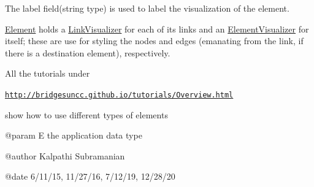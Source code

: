 The label field(string type) is used to label the visualization of the element.

\hyperlink{classbridges_1_1datastructure_1_1_element}{Element} holds a \hyperlink{classbridges_1_1datastructure_1_1_link_visualizer}{Link\+Visualizer} for each of its links and an \hyperlink{classbridges_1_1datastructure_1_1_element_visualizer}{Element\+Visualizer} for itself; these are use for styling the nodes and edges (emanating from the link, if there is a destination element), respectively.

All the tutorials under

\href{http://bridgesuncc.github.io/tutorials/Overview.html}{\tt http\+://bridgesuncc.\+github.\+io/tutorials/\+Overview.\+html}

show how to use different types of elements \begin{DoxyVerb}@param E the application data type

@author Kalpathi Subramanian

@date 6/11/15, 11/27/16, 7/12/19, 12/28/20\end{DoxyVerb}
